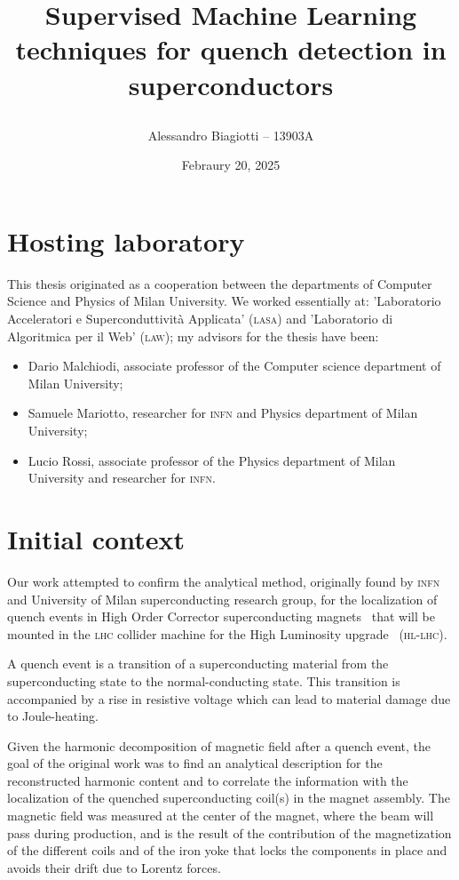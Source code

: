 \documentclass[a4paper, notitlepage]{article}
\title{
	\textsf{Supervised Machine Learning techniques for quench detection in superconductors} \\
	\author{Alessandro Biagiotti -- 13903A}
        \date{Febraury 20, 2025}
}
\begin{document}
\maketitle
\section{Hosting laboratory}
This thesis originated as a cooperation between the departments of Computer Science and Physics of
Milan University. We worked essentially at: 'Laboratorio Acceleratori e Superconduttività Applicata'
(\textsc{lasa}) and 'Laboratorio di Algoritmica per il Web' (\textsc{law}); my advisors for the
thesis have been:
\begin{itemize}
	\item Dario Malchiodi, associate professor of the Computer science department of Milan University;
	\item Samuele Mariotto, researcher for \textsc{infn} and Physics department of Milan
	      University;
	\item Lucio Rossi, associate professor of the Physics department of Milan University and
	      researcher for \textsc{infn}.
\end{itemize}
\section{Initial context}
Our work attempted to confirm the analytical method, originally found by \textsc{infn} and University of Milan superconducting research group, for the localization of quench events in High Order Corrector superconducting magnets~\cite{mariotto2022-hoc, mariotto2022-generic} that will be mounted in the \textsc{lhc} collider machine for the High Luminosity upgrade~\cite{rossi2024-hllhc} (\textsc{hl-lhc}).

A quench event is a transition of a superconducting material from the superconducting state to the
normal-conducting state. This transition is accompanied by a rise in resistive voltage which can
lead to material damage due to Joule-heating.

Given the harmonic decomposition of magnetic field after a quench event, the goal of the original
work was to find an analytical description for the reconstructed harmonic content and to correlate
the information with the localization of the quenched superconducting coil(s) in the magnet
assembly. The magnetic field was measured at the center of the magnet, where the beam will pass
during production, and is the result of the contribution of the magnetization of the different coils
and of the iron yoke that locks the components in place and avoids their drift due to Lorentz
forces.
\end{document}
